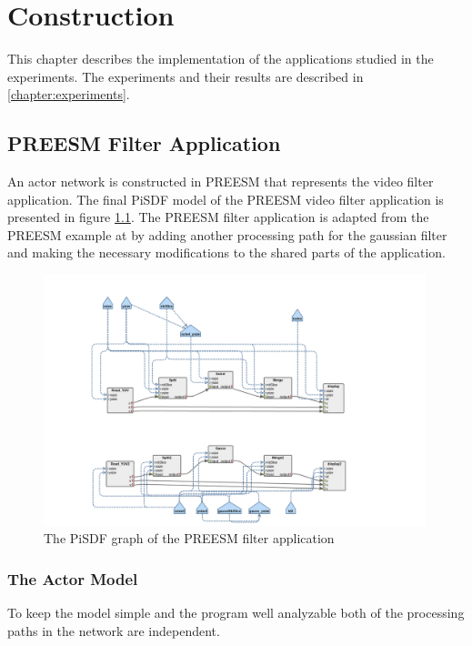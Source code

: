 \chapter{Construction}
\label{chapter:construction}
This chapter describes the implementation of the applications studied in the experiments. The experiments and their results are described in \ref{chapter:experiments}. 

\section{PREESM Filter Application}
\label{sec:preesmapp}
An actor network is constructed in PREESM that represents the video filter application. The final PiSDF model of the PREESM video filter application is presented in figure \ref{fig:preesm_actors}. The PREESM filter application is adapted from the PREESM example at \cite{preesmtut} by adding another processing path for the gaussian filter and making the necessary modifications to the shared parts of the application.

\begin{figure}[h!]
    \begin{center}
        \includegraphics[width=0.99\textwidth]{images/preesm_diagram.png}
        \caption{The PiSDF graph of the PREESM filter application}
        \label{fig:preesm_actors}
    \end{center}
\end{figure}

\subsection{The Actor Model}
\label{subsec:actors}
To keep the model simple and the program well analyzable both of the processing paths in the network are independent. 

